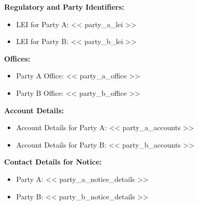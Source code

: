 \documentclass[11pt, a4paper]{article}
\newcommand{\templatetag}[1]{} %
\begin{document}
\templatetag{<<- endif >>}

\templatetag{<<- if party_a_lei or party_b_lei >>}
\noindent \textbf{Regulatory and Party Identifiers:}
\begin{itemize}[leftmargin=2cm, label={}, itemsep=3pt]
\templatetag{<<- if party_a_lei >>}
    \item LEI for Party A: << party_a_lei >>
\templatetag{<<- endif >>}
\templatetag{<<- if party_b_lei >>}
    \item LEI for Party B: << party_b_lei >>
\templatetag{<<- endif >>}
\end{itemize}
\vspace{0.2cm}
\templatetag{<<- endif >>}

\templatetag{<<- if party_a_office or party_b_office >>}
\noindent \textbf{Offices:}
\begin{itemize}[leftmargin=2cm, label={}, itemsep=3pt]
\templatetag{<<- if party_a_office >>}
    \item Party A Office: << party_a_office >>
\templatetag{<<- endif >>}
\templatetag{<<- if party_b_office >>}
    \item Party B Office: << party_b_office >>
\templatetag{<<- endif >>}
\end{itemize}
\vspace{0.2cm}
\templatetag{<<- endif >>}

\templatetag{<<- if party_a_accounts or party_b_accounts >>}
\noindent \textbf{Account Details:}
\begin{itemize}[leftmargin=2cm, label={}, itemsep=3pt]
\templatetag{<<- if party_a_accounts >>}
    \item Account Details for Party A: << party_a_accounts >>
\templatetag{<<- endif >>}
\templatetag{<<- if party_b_accounts >>}
    \item Account Details for Party B: << party_b_accounts >>
\templatetag{<<- endif >>}
\end{itemize}
\vspace{0.2cm}
\templatetag{<<- endif >>}

\templatetag{<<- if party_a_notice_details or party_b_notice_details >>}
\noindent \textbf{Contact Details for Notice:}
\begin{itemize}[leftmargin=2cm, label={}, itemsep=3pt]
\templatetag{<<- if party_a_notice_details >>}
    \item Party A: << party_a_notice_details >>
\templatetag{<<- endif >>}
\templatetag{<<- if party_b_notice_details >>}
    \item Party B: << party_b_notice_details >>
\templatetag{<<- endif >>}
\end{itemize}
\vspace{0.2cm}
\templatetag{<<- endif >>}
\end{document}
